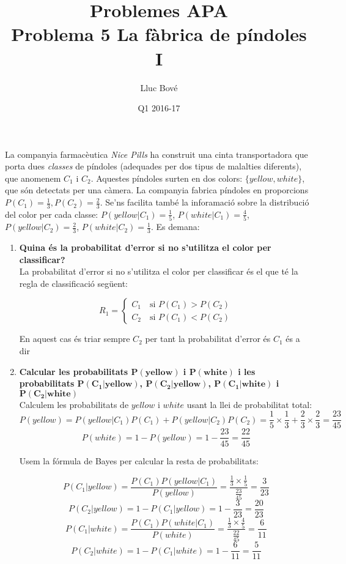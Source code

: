 \documentclass[a4paper]{article}
\title{Problemes APA \\ Problema 5 La fàbrica de píndoles I}
\author{Lluc Bové}
\date{Q1 2016-17}
\begin{document}
\maketitle

La companyia farmacèutica \textit{Nice Pills} ha construit una cinta transportadora que porta dues \textit{classes} de píndoles (adequades per dos tipus de malalties diferents), que anomenem $C_1$ i $C_2$. Aquestes píndoles surten en dos colors: $\{yellow,white\}$, que són detectats per una càmera. La companyia fabrica píndoles en proporcions $P(C_1) = \frac{1}{3}, P(C_2) = \frac{2}{3}$. Se'ns facilita també la inforamació sobre la distribució del color per cada classe: $P(yellow|C_1) = \frac{1}{5}$, $P(white | C_1) = \frac{4}{5}$, $P(yellow| C_2) = \frac{2}{3}$, $P(white|C_2) = \frac{1}{3}$. Es demana:
\begin{enumerate}
	
	\item\textbf{Quina és la probabilitat d'error si no s'utilitza el color per classificar?}\\
		
	La probabilitat d'error si no s'utilitza el color per classificar és el que té la regla de classificació següent:
	
	$$
	R_1 =
	\begin{cases}
	  C_1 \quad \text{si } P(C_1) > P(C_2) \\
	  C_2 \quad \text{si } P(C_1) < P(C_2)
	\end{cases}
	$$	
	
	En aquest cas és triar sempre $C_2$ per tant la probabilitat d'error és $C_1$ és a dir 
	
	\item\textbf{ Calcular les probabilitats $\boldsymbol{P(yellow)}$ i $\boldsymbol{P(white)}$ i les probabilitats $\boldsymbol{P(C_1|yellow)}$, $\boldsymbol{P(C_2| yellow)}$, $\boldsymbol{P(C_1 | white)}$ i $\boldsymbol{P(C_2 | white)}$} \\
	
	Calculem les probabilitats de $yellow$ i $white$ usant la llei de probabilitat total:
	$$
	P(yellow) = P(yellow | C_1) P(C_1) + P(yellow | C_2) P(C_2) = \frac{1}{5}\times\frac{1}{3} + \frac{2}{3}\times\frac{2}{3} = \boxed{\frac{23}{45}}
	$$
	$$
	P(white) = 1 - P(yellow) = 1 - \frac{23}{45} = \boxed{\frac{22}{45}} 
	$$
	
	Usem la fórmula de Bayes per calcular la resta de probabilitats:
	
	$$
	P(C_1 | yellow) = \frac{P(C_1)P(yellow | C_1)}{P(yellow)} = \frac{\frac{1}{3}\times \frac{1}{5}}{\frac{23}{45}} = \boxed{\frac{3}{23}}
	$$
	$$
	P(C_2 | yellow) = 1  - P(C_1 | yellow) = 1 - \frac{3}{23} = \boxed{\frac{20}{23}}
	$$
	$$
	P(C_1 | white) = \frac{P(C_1)P(white | C_1)}{P(white)} = \frac{\frac{1}{3}\times \frac{4}{5}}{\frac{22}{45}} = \boxed{\frac{6}{11}}
	$$
	$$
	P(C_2 | white) = 1 - P(C_1 | white) = 1 - \frac{6}{11} = \boxed{\frac{5}{11}}
	$$
	

\end{enumerate}
\end{document}
